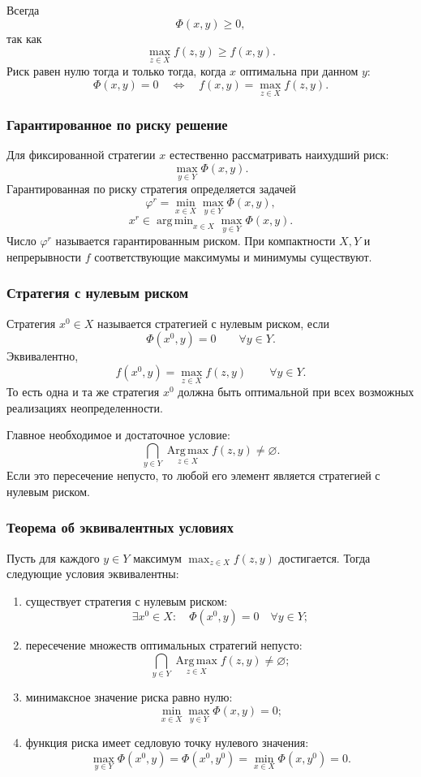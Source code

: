 \documentclass[12pt,a4paper]{article}
\DeclareMathOperator*{\argmin}{arg\,min}
\newcommand{\Argmax}{\operatorname*{Arg\,max}}
\begin{document}
Всегда
\[
\Phi(x,y)\ge 0,
\]
так как
\[
\max_{z\in X}f(z,y)\ge f(x,y).
\]
Риск равен нулю тогда и только тогда, когда $x$ оптимальна при данном $y$:
\[
\Phi(x,y)=0
\quad\Longleftrightarrow\quad
f(x,y)=\max_{z\in X}f(z,y).
\]

\subsubsection{Гарантированное по риску решение}
Для фиксированной стратегии $x$ естественно рассматривать наихудший риск:
\[
\max_{y\in Y}\Phi(x,y).
\]
Гарантированная по риску стратегия определяется задачей
\[
\varphi^r=\min_{x\in X}\max_{y\in Y}\Phi(x,y),
\]
\[
x^r\in \argmin_{x\in X}\max_{y\in Y}\Phi(x,y).
\]
Число $\varphi^r$ называется гарантированным риском. При компактности $X,Y$ и непрерывности $f$ соответствующие максимумы и минимумы существуют.

\subsubsection{Стратегия с нулевым риском}
Стратегия $x^0\in X$ называется стратегией с нулевым риском, если
\[
\Phi(x^0,y)=0\qquad \forall y\in Y.
\]
Эквивалентно,
\[
f(x^0,y)=\max_{z\in X}f(z,y)\qquad \forall y\in Y.
\]
То есть одна и та же стратегия $x^0$ должна быть оптимальной при всех возможных реализациях неопределенности.

Главное необходимое и достаточное условие:
\[
\bigcap_{y\in Y}\Argmax_{z\in X} f(z,y)\ne\varnothing.
\]
Если это пересечение непусто, то любой его элемент является стратегией с нулевым риском.

\subsubsection{Теорема об эквивалентных условиях}
Пусть для каждого $y\in Y$ максимум $\max_{z\in X}f(z,y)$ достигается. Тогда следующие условия эквивалентны:
\begin{enumerate}
  \item существует стратегия с нулевым риском:
  \[
  \exists x^0\in X:\quad \Phi(x^0,y)=0\quad \forall y\in Y;
  \]
  \item пересечение множеств оптимальных стратегий непусто:
  \[
  \bigcap_{y\in Y}\Argmax_{z\in X} f(z,y)\ne\varnothing;
  \]
  \item минимаксное значение риска равно нулю:
  \[
  \min_{x\in X}\max_{y\in Y}\Phi(x,y)=0;
  \]
  \item функция риска имеет седловую точку нулевого значения:
  \[
  \max_{y\in Y}\Phi(x^0,y)=\Phi(x^0,y^0)=\min_{x\in X}\Phi(x,y^0)=0.
  \]
\end{enumerate}
\end{document}
